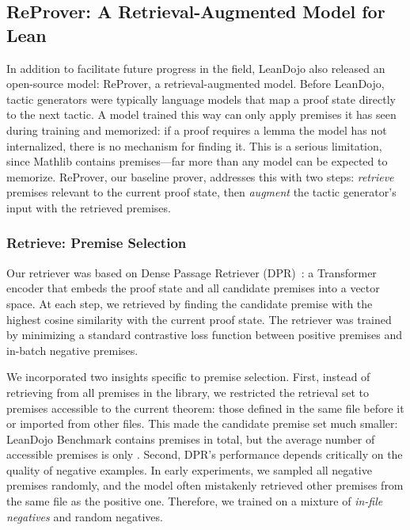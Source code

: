 \subsection{ReProver: A Retrieval-Augmented Model for Lean}
In addition to facilitate future progress in the field, LeanDojo also released an open-source
model: ReProver, a retrieval-augmented model. Before LeanDojo, tactic generators were typically language models that map a
proof state directly to the next tactic. A model trained this way can only
apply premises it has seen during training and memorized: if a proof requires
a lemma the model has not internalized, there is no mechanism for finding it.
This is a serious limitation, since Mathlib contains \numpremises{}
premises---far more than any model can be expected to memorize. ReProver, our
baseline prover, addresses this with two steps: \emph{retrieve} premises
relevant to the current proof state, then \emph{augment} the tactic
generator's input with the retrieved premises.

\subsubsection{Retrieve: Premise Selection}

Our retriever was based on Dense Passage Retriever
(DPR)~\citep{karpukhin2020dense}: a Transformer encoder that embeds the proof state
and all candidate premises into a vector space. At each step, we retrieved by finding the candidate premise
with the highest cosine similarity with the current proof state.
The retriever was trained by minimizing a standard contrastive loss function between positive premises
and in-batch negative premises.

We incorporated two insights specific to premise selection. First,
instead of retrieving from all premises in the library, we restricted the retrieval set to
premises accessible to the current theorem: those defined in the same file
before it or imported from other files. This made the candidate premise set much smaller:
LeanDojo Benchmark contains \numpremises{} premises in total, but the average number of accessible premises is only
\numaccessiblepremises{}. Second, DPR's performance depends critically on the
quality of negative examples. In early experiments, we sampled all negative
premises randomly, and the model often mistakenly retrieved other premises
from the same file as the positive one. Therefore, we trained on a mixture of
\emph{in-file negatives} and random negatives.


